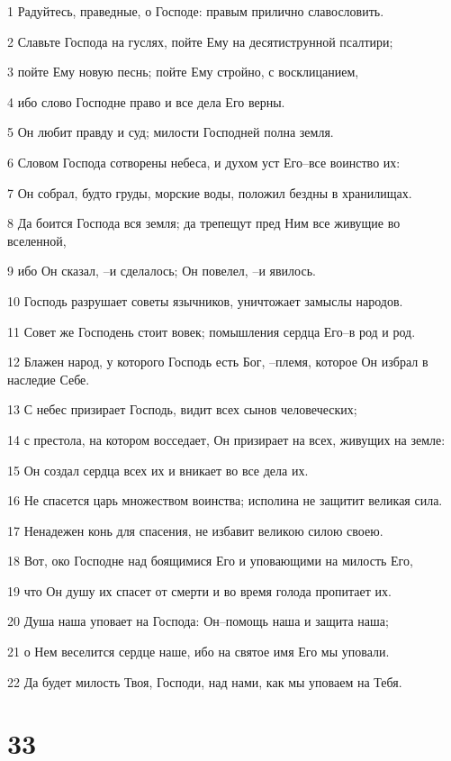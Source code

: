 \par 1 Радуйтесь, праведные, о Господе: правым прилично славословить.
\par 2 Славьте Господа на гуслях, пойте Ему на десятиструнной псалтири;
\par 3 пойте Ему новую песнь; пойте Ему стройно, с восклицанием,
\par 4 ибо слово Господне право и все дела Его верны.
\par 5 Он любит правду и суд; милости Господней полна земля.
\par 6 Словом Господа сотворены небеса, и духом уст Его--все воинство их:
\par 7 Он собрал, будто груды, морские воды, положил бездны в хранилищах.
\par 8 Да боится Господа вся земля; да трепещут пред Ним все живущие во вселенной,
\par 9 ибо Он сказал, --и сделалось; Он повелел, --и явилось.
\par 10 Господь разрушает советы язычников, уничтожает замыслы народов.
\par 11 Совет же Господень стоит вовек; помышления сердца Его--в род и род.
\par 12 Блажен народ, у которого Господь есть Бог, --племя, которое Он избрал в наследие Себе.
\par 13 С небес призирает Господь, видит всех сынов человеческих;
\par 14 с престола, на котором восседает, Он призирает на всех, живущих на земле:
\par 15 Он создал сердца всех их и вникает во все дела их.
\par 16 Не спасется царь множеством воинства; исполина не защитит великая сила.
\par 17 Ненадежен конь для спасения, не избавит великою силою своею.
\par 18 Вот, око Господне над боящимися Его и уповающими на милость Его,
\par 19 что Он душу их спасет от смерти и во время голода пропитает их.
\par 20 Душа наша уповает на Господа: Он--помощь наша и защита наша;
\par 21 о Нем веселится сердце наше, ибо на святое имя Его мы уповали.
\par 22 Да будет милость Твоя, Господи, над нами, как мы уповаем на Тебя.

\chapter{33}

